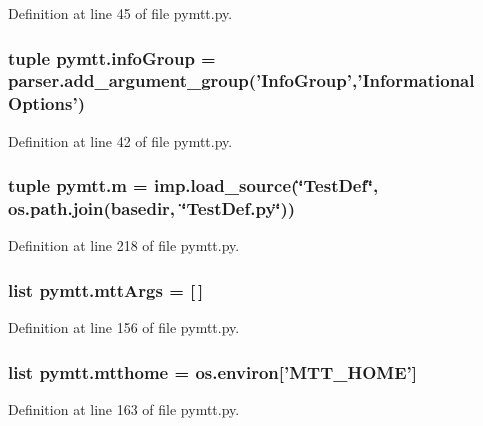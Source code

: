 Definition at line 45 of file pymtt.\-py.

\hypertarget{namespacepymtt_a99ad2929ecc4e17f97670bed44f08c35}{
\subsubsection[{info\-Group}]{\setlength{\rightskip}{0pt plus 5cm}tuple pymtt.\-info\-Group = parser.\-add\-\_\-argument\-\_\-group('Info\-Group','Informational Options')}}\label{namespacepymtt_a99ad2929ecc4e17f97670bed44f08c35}


Definition at line 42 of file pymtt.\-py.

\hypertarget{namespacepymtt_ab13a60c31fa69917ce06c1a2631aaf02}{
\subsubsection[{m}]{\setlength{\rightskip}{0pt plus 5cm}tuple pymtt.\-m = imp.\-load\-\_\-source(\char`\"{}Test\-Def\char`\"{}, os.\-path.\-join({\bf basedir}, \char`\"{}Test\-Def.\-py\char`\"{}))}}\label{namespacepymtt_ab13a60c31fa69917ce06c1a2631aaf02}


Definition at line 218 of file pymtt.\-py.

\hypertarget{namespacepymtt_a906126cc10dd5691df7385d56e802d40}{
\subsubsection[{mtt\-Args}]{\setlength{\rightskip}{0pt plus 5cm}list pymtt.\-mtt\-Args = \mbox{[}$\,$\mbox{]}}}\label{namespacepymtt_a906126cc10dd5691df7385d56e802d40}


Definition at line 156 of file pymtt.\-py.

\hypertarget{namespacepymtt_a109ef76f074b08666398bf6a38219cfc}{
\subsubsection[{mtthome}]{\setlength{\rightskip}{0pt plus 5cm}list pymtt.\-mtthome = os.\-environ\mbox{[}'M\-T\-T\-\_\-\-H\-O\-M\-E'\mbox{]}}}\label{namespacepymtt_a109ef76f074b08666398bf6a38219cfc}


Definition at line 163 of file pymtt.\-py.

